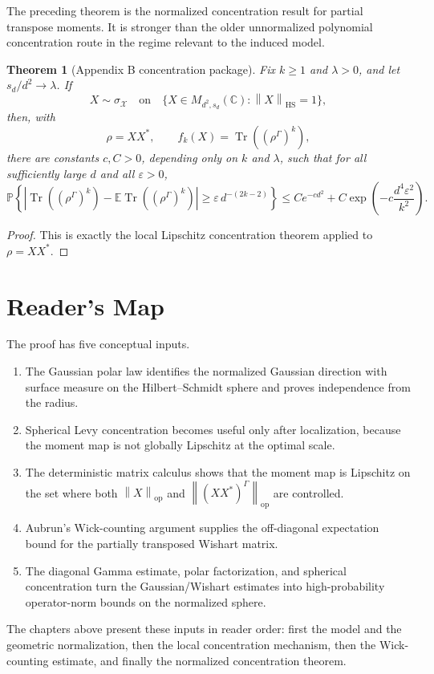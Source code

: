 \documentclass[11pt,oneside]{book}
\newtheorem{theorem}{Theorem}[chapter]
\DeclareMathOperator{\Tr}{Tr}
\newcommand{\C}{\mathbb C}
\newcommand{\E}{\mathbb E}
\newcommand{\Prob}{\mathbb P}
\newcommand{\1}{\mathbf 1}
\newcommand{\eps}{\varepsilon}
\newcommand{\GammaPT}{\Gamma}
\newcommand{\HS}{\mathrm{HS}}
\newcommand{\op}{\mathrm{op}}
\newcommand{\abs}[1]{\left|#1\right|}
\newcommand{\norm}[1]{\left\|#1\right\|}
\begin{document}
The preceding theorem is the normalized concentration result for partial
transpose moments.  It is stronger than the older unnormalized polynomial
concentration route in the regime relevant to the induced model.

\begin{theorem}[Appendix B concentration package]
Fix \(k\ge1\) and \(\lambda>0\), and let \(s_d/d^2\to\lambda\).  If
\[
  X\sim\sigma_{\mathcal X}
  \quad\text{on}\quad
  \{X\in M_{d^2,s_d}(\C):\norm X_{\HS}=1\},
\]
then, with
\[
  \rho=XX^*,
  \qquad
  f_k(X)=\Tr((\rho^{\GammaPT})^k),
\]
there are constants \(c,C>0\), depending only on \(k\) and \(\lambda\), such
that for all sufficiently large \(d\) and all \(\eps>0\),
\[
  \Prob\left\{
    \abs{\Tr((\rho^{\GammaPT})^k)
      -\E\Tr((\rho^{\GammaPT})^k)}
    \ge
    \eps\,d^{-(2k-2)}
  \right\}
  \le
  C e^{-cd^2}
  +
  C\exp\left(-c\frac{d^4\eps^2}{k^2}\right).
\]
\end{theorem}

\begin{proof}
This is exactly the local Lipschitz concentration theorem applied to
\(\rho=XX^*\).
\end{proof}

\backmatter

\chapter{Reader's Map}

The proof has five conceptual inputs.

\begin{enumerate}
\item The Gaussian polar law identifies the normalized Gaussian direction with
surface measure on the Hilbert--Schmidt sphere and proves independence from
the radius.
\item Spherical Levy concentration becomes useful only after localization,
because the moment map is not globally Lipschitz at the optimal scale.
\item The deterministic matrix calculus shows that the moment map is
Lipschitz on the set where both \(\norm X_{\op}\) and
\(\norm{(XX^*)^{\GammaPT}}_{\op}\) are controlled.
\item Aubrun's Wick-counting argument supplies the off-diagonal expectation
bound for the partially transposed Wishart matrix.
\item The diagonal Gamma estimate, polar factorization, and spherical
concentration turn the Gaussian/Wishart estimates into high-probability
operator-norm bounds on the normalized sphere.
\end{enumerate}

The chapters above present these inputs in reader order: first the model and
the geometric normalization, then the local concentration mechanism, then the
Wick-counting estimate, and finally the normalized concentration theorem.
\end{document}
